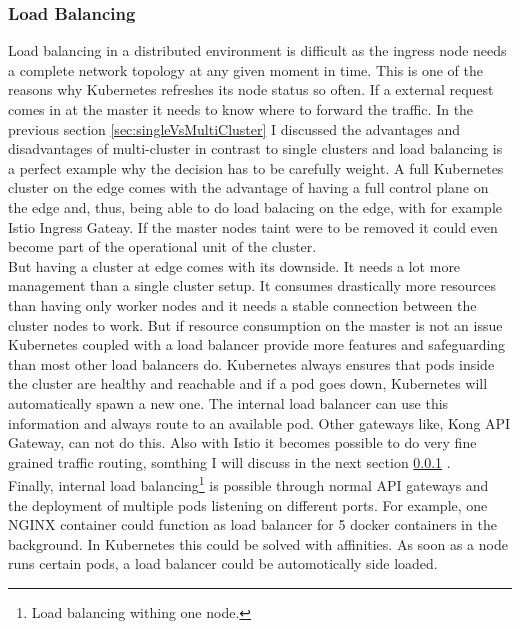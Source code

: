 \subsubsection{Load Balancing}
Load balancing in a distributed environment is difficult as the ingress node needs a complete network topology at any given moment in time. This is one of the reasons why Kubernetes refreshes its node status so often. If a external request comes in at the master it needs to know where to forward the traffic. In the previous section \cref{sec:singleVsMultiCluster}  I discussed the advantages and disadvantages of multi-cluster in contrast to single clusters and load balancing is a perfect example why the decision has to be carefully weight. A full Kubernetes cluster on the edge comes with the advantage of having a full control plane on the edge and, thus, being able to do load balacing on the edge, with for example Istio Ingress Gateay. If the master nodes taint were to be removed it could even become part of the operational unit of the cluster.\\
But having a cluster at edge comes with its downside. It needs a lot more management than a single cluster setup. It consumes drastically more resources than having only worker nodes and it needs a stable connection between the cluster nodes to work. But if resource consumption on the master is not an issue Kubernetes coupled with a load balancer provide more features and safeguarding than most other load balancers do. Kubernetes always ensures that pods inside the cluster are healthy and reachable and if a pod goes down, Kubernetes will automatically spawn a new one. The internal load balancer can use this information and always route to an available pod. Other gateways like, Kong API Gateway, can not do this. Also with Istio it becomes possible to do very fine grained traffic routing, somthing I will discuss in the next section \cref{} \nameref{}.\\
Finally, internal load balancing\footnote{Load balancing withing one node.} is possible through normal API gateways and the deployment of multiple pods listening on different ports. For example, one NGINX container could function as load balancer for 5 docker containers in the background. In Kubernetes this could be solved with affinities. As soon as a node runs certain pods, a load balancer could be automotically side loaded.